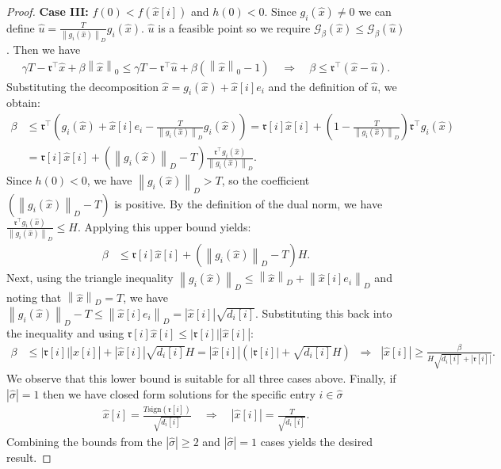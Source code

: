 \documentclass[11pt]{article}
\theoremstyle{plain}
\theoremstyle{definition}
\theoremstyle{plain}
\newcommand{\norm}[1]{\left\lVert#1\right\rVert}
\newcommand{\abs}[1]{\left\lvert#1\right\rvert}
\newcommand{\tpose}[1]{#1^{\top}}
\newcommand{\cG}{{\mathcal G}}
\newcommand{\ccr}{{\mathfrak r}}
\begin{document}
\begin{proof}
   \textbf{Case III: } $f(0)<f(\hat{x}[i])$ and $h(0)<0$. Since $g_i(\hat{x})\neq 0$ we can define $\hat{u}=\frac{T}{\norm{g_i(\hat{x})}_D}g_i(\hat{x})$. $\hat{u}$ is a feasible point so we require $\cG_\beta(\hat{x})\leq \cG_\beta(\hat{u})$. Then we have
\begin{align*}
    \gamma T - \tpose{\ccr}\hat{x} + \beta\norm{\hat{x}}_0 \leq \gamma T - \tpose{\ccr}\hat{u} + \beta(\norm{\hat{x}}_0 - 1) \quad\Rightarrow\quad
    \beta \leq \tpose{\ccr}(\hat{x} - \hat{u}).
\end{align*}
Substituting the decomposition $\hat{x} = g_i(\hat{x}) + \hat{x}[i]e_i$ and the definition of $\hat{u}$, we obtain:
\begin{align*}
    \beta &\leq \tpose{\ccr}\left(g_i(\hat{x}) + \hat{x}[i]e_i - \frac{T}{\norm{g_i(\hat{x})}_D} g_i(\hat{x})\right) = \ccr[i]\hat{x}[i] + \left(1 - \frac{T}{\norm{g_i(\hat{x})}_D}\right)\tpose{\ccr}g_i(\hat{x}) \\
    &= \ccr[i]\hat{x}[i] + \left(\norm{g_i(\hat{x})}_D - T\right) \frac{\tpose{\ccr}g_i(\hat{x})}{\norm{g_i(\hat{x})}_D}.
\end{align*}
Since $h(0) < 0$, we have $\norm{g_i(\hat{x})}_D > T$, so the coefficient $(\norm{g_i(\hat{x})}_D - T)$ is positive. By the definition of the dual norm, we have $\frac{\tpose{\ccr}g_i(\hat{x})}{\norm{g_i(\hat{x})}_D} \leq H$. Applying this upper bound yields:
\begin{align*}
    \beta &\leq \ccr[i]\hat{x}[i] + (\norm{g_i(\hat{x})}_D - T)H.
\end{align*}
Next, using the triangle inequality $\norm{g_i(\hat{x})}_D \leq \norm{\hat{x}}_D + \norm{\hat{x}[i]e_i}_D$ and noting that $\norm{\hat{x}}_D=T$, we have $\norm{g_i(\hat{x})}_D - T \leq \norm{\hat{x}[i]e_i}_D = \abs{\hat{x}[i]}\sqrt{d_i[i]}$.
Substituting this back into the inequality and using $\ccr[i]\hat{x}[i] \leq \abs{\ccr[i]}\abs{\hat{x}[i]}$:
\begin{align*}
    \beta &\leq \abs{\ccr[i]}\abs{\hat{x}[i]} + \abs{\hat{x}[i]}\sqrt{d_i[i]}H = \abs{\hat{x}[i]} \left( \abs{\ccr[i]} + \sqrt{d_i[i]}H \right) \;\;\Rightarrow\;\;\abs{\hat{x}[i]} \geq \frac{\beta}{H\sqrt{d_i[i]} + \abs{\ccr[i]}}.
\end{align*}
We observe that this lower bound is suitable for all three cases above.
Finally, if $\abs{\hat{\sigma}}=1$ then we have closed form solutions for the specific entry $i\in\hat{\sigma}$
\begin{align*}
    \hat{x}[i]=\frac{T\mathrm{sign}(\ccr[i])}{\sqrt{d_i[i]}}\quad\Rightarrow\quad \abs{\hat{x}[i]}=\frac{T}{\sqrt{d_i[i]}}.
\end{align*}
Combining the bounds from the $|\hat{\sigma}|\geq 2$ and $|\hat{\sigma}|=1$ cases yields the desired result.
   \end{proof}
\end{document}
